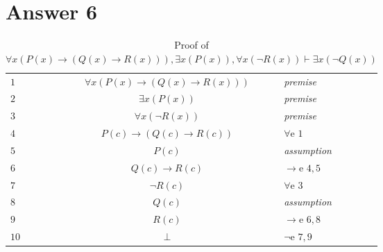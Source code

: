 \documentclass[12pt]{article}
\begin{document}
\section*{Answer 6}
\begin{table}[H]
	\centering
	\caption{Proof of $ \forall x (P(x) \rightarrow (Q(x) \rightarrow R(x))), \exists x (P(x)), \forall x (\neg R(x)) \vdash \exists x (\neg Q(x))  $}
	\begin{tabular}{lllclll}
	\hline 
	\hline
		$1$ & & & $ \forall x (P(x) \rightarrow (Q(x) \rightarrow R(x)))$ & \textit{premise} &  & \\ 
		
		$2$ & & & $ \exists x (P(x))$ & \textit{premise} &  & \\ 
		
		$3$ & & & $ \forall x (\neg R(x))$ & \textit{premise} &  & \\ %
		
		$4$ & & & $P(c) \rightarrow (Q(c) \rightarrow R(c))$ & $\forall$e $1$ & &\multicolumn{1}{c}{}\\ \cline{3-6}
		 
		$5$ &\multicolumn{1}{c}{}  & \multicolumn{1}{|c}{} & $P(c) $ & \textit{assumption} & \multicolumn{1}{l|}{} & \multicolumn{1}{c}{} \\ 
		
		$6$ &\multicolumn{1}{c}{}  & \multicolumn{1}{|c}{} & $Q(c) \rightarrow R(c)$ &$\rightarrow$e $4,5 $ & \multicolumn{1}{l|}{} & \multicolumn{1}{c}{} \\ 
		
		$7$ &\multicolumn{1}{c}{}  & \multicolumn{1}{|c}{} & $\neg R(c)$ &$\forall$e $3 $ & \multicolumn{1}{l|}{} & \multicolumn{1}{c}{} \\ \cline{4-5}
		
	    $8$ &\multicolumn{1}{c}{}  & \multicolumn{1}{|c}{} & \multicolumn{1}{|c}{$Q(c)$} & \multicolumn{1}{l|}{\textit{assumption}} & \multicolumn{1}{l|}{} & \multicolumn{1}{c}{} \\ 
	    
	    $9$ &\multicolumn{1}{c}{}  & \multicolumn{1}{|c}{} & \multicolumn{1}{|c}{$R(c)$} & \multicolumn{1}{l|}{$\rightarrow$e $6,8$} & \multicolumn{1}{l|}{} & \multicolumn{1}{c}{} \\ 
	    
	    $10$ &\multicolumn{1}{c}{}  & \multicolumn{1}{|c}{} & \multicolumn{1}{|c}{$\perp$} & \multicolumn{1}{l|}{$\neg$e $7,9$} & \multicolumn{1}{l|}{} & \multicolumn{1}{c}{} \\ \cline{4-5}
	    

\end{tabular}
\end{table}
\end{document}

